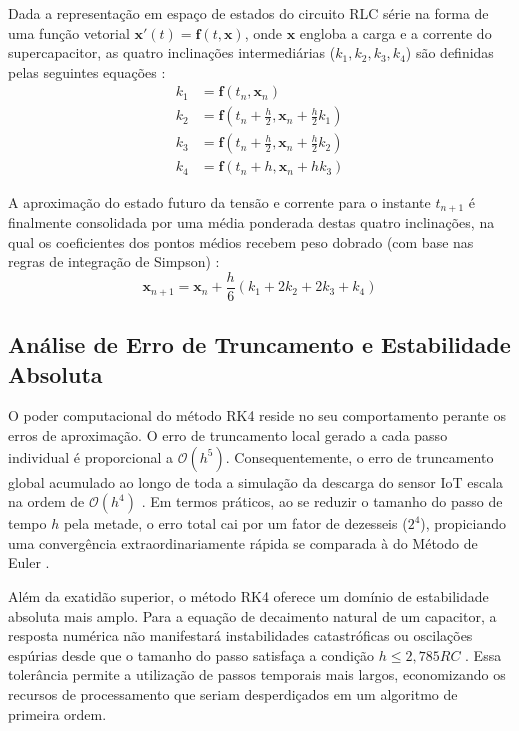 \documentclass[12pt, a4paper]{article}
\begin{document}
Dada a representação em espaço de estados do circuito RLC série na forma de uma função vetorial $\mathbf{x}'(t) = \mathbf{f}(t, \mathbf{x})$, onde $\mathbf{x}$ engloba a carga e a corrente do supercapacitor, as quatro inclinações intermediárias ($k_1, k_2, k_3, k_4$) são definidas pelas seguintes equações \cite{razak2025, modelagem2026}:
\begin{align}
    k_1 &= \mathbf{f}(t_n, \mathbf{x}_n) \\
    k_2 &= \mathbf{f}\left(t_n + \frac{h}{2}, \mathbf{x}_n + \frac{h}{2} k_1\right) \\
    k_3 &= \mathbf{f}\left(t_n + \frac{h}{2}, \mathbf{x}_n + \frac{h}{2} k_2\right) \\
    k_4 &= \mathbf{f}(t_n + h, \mathbf{x}_n + h k_3)
\end{align}

A aproximação do estado futuro da tensão e corrente para o instante $t_{n+1}$ é finalmente consolidada por uma média ponderada destas quatro inclinações, na qual os coeficientes dos pontos médios recebem peso dobrado (com base nas regras de integração de Simpson) \cite{firgelli2026rk, razak2025}:
\begin{equation}
    \mathbf{x}_{n+1} = \mathbf{x}_n + \frac{h}{6} (k_1 + 2k_2 + 2k_3 + k_4)
\end{equation}

\subsection{Análise de Erro de Truncamento e Estabilidade Absoluta}
O poder computacional do método RK4 reside no seu comportamento perante os erros de aproximação. O erro de truncamento local gerado a cada passo individual é proporcional a $\mathcal{O}(h^5)$. Consequentemente, o erro de truncamento global acumulado ao longo de toda a simulação da descarga do sensor IoT escala na ordem de $\mathcal{O}(h^4)$ \cite{modelagem2026, wikipediaRK}. Em termos práticos, ao se reduzir o tamanho do passo de tempo $h$ pela metade, o erro total cai por um fator de dezesseis ($2^4$), propiciando uma convergência extraordinariamente rápida se comparada à do Método de Euler \cite{firgelli2026rk, modelagem2026}.

Além da exatidão superior, o método RK4 oferece um domínio de estabilidade absoluta mais amplo. Para a equação de decaimento natural de um capacitor, a resposta numérica não manifestará instabilidades catastróficas ou oscilações espúrias desde que o tamanho do passo satisfaça a condição $h \le 2,785 RC$ \cite{modelagem2026, firgelli2026rk}. Essa tolerância permite a utilização de passos temporais mais largos, economizando os recursos de processamento que seriam desperdiçados em um algoritmo de primeira ordem.
\end{document}
